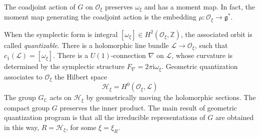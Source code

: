 \documentclass[12pt]{article}
\numberwithin{equation}{section}
\newcommand\beq{\begin{equation}}
\newcommand\eeq{\end{equation}}
\theoremstyle{definition}
\newcommand {\BC}   {\mathbb C}
\newcommand {\BZ}   {\mathbb Z}
\newcommand {\CalH} {\mathcal H}
\newcommand {\CalL} {\mathcal L}
\newcommand {\CalO} {\mathcal O}
\newcommand {\fg} {\mathfrak{g}}
\newcommand {\ii} {\mathrm{i}}
\begin{document}
The coadjoint action of $G$ on ${\CalO}_{\xi}$
preserves ${\omega}_{\xi}$ and has a moment map. In fact, the moment map generating the coadjoint action is the embedding ${\mu}: {\CalO}_{\xi} \rightarrow {\fg}^{*}$. 

When the symplectic form is integral
$[{\omega}_{\xi}] \in H^{2}({\CalO}_{\xi}, {\BZ})$, the associated orbit is called \emph{quantizable}. 
There is a holomorphic line bundle ${\CalL} \to {\CalO}_{\xi}$, such that $c_{1}({\CalL}) = [{\omega}_{\xi}]$. There is a $U(1)$-connection
$\nabla$ on $\CalL$, whose curvature is determined by the symplectic structure
$F_{\nabla} = 2\pi \ii {\omega}_{\xi}$. Geometric quantization associates to $\CalO_{\xi}$ the Hilbert space 
\beq
{\CalH}_{\xi} = H^{0} ( {\CalO}_{\xi} , {\CalL} ) 
\eeq
The group $G_{\BC}$ acts on ${\CalH}_{\xi}$ by geometrically moving the holomorphic sections. The compact group $G$ preserves the inner product. The main result of geometric quantization program is that all the irreducible representations of $G$
are obtained in this way, $R = {\CalH}_{\xi}$, for some ${\xi} = {\xi}_{R}$. 
\end{document}
